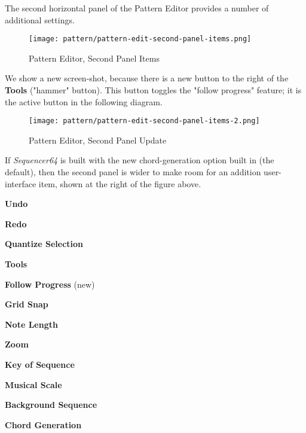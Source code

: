    The second horizontal panel of the Pattern Editor provides a number
   of additional settings.

\begin{figure}[H]
   \centering 
   \texttt{[image: pattern/pattern-edit-second-panel-items.png]}
   \caption{Pattern Editor, Second Panel Items}
   \label{fig:pattern_editor_main_panel_items}
\end{figure}

   We show a new screen-shot, because there is a new button to the right
   of the \textbf{Tools} ("hammer" button).  This button toggles the "follow
   progress" feature; it is the active button in the following diagram.

\begin{figure}[H]
   \centering 
   \texttt{[image: pattern/pattern-edit-second-panel-items-2.png]}
   \caption{Pattern Editor, Second Panel Update}
   \label{fig:pattern_editor_main_panel_update}
\end{figure}

   If \textsl{Sequencer64} is built with the new chord-generation option
   built in (the default), then the second panel is wider to make room for an
   addition user-interface item, shown at the right of the figure above.


   \begin{enumber}
      \item \textbf{Undo}
      \item \textbf{Redo}
      \item \textbf{Quantize Selection}
      \item \textbf{Tools}
      \item \textbf{Follow Progress} (new)
      \item \textbf{Grid Snap}
      \item \textbf{Note Length}
      \item \textbf{Zoom}
      \item \textbf{Key of Sequence}
      \item \textbf{Musical Scale}
      \item \textbf{Background Sequence}
      \item \textbf{Chord Generation}
   \end{enumber}


